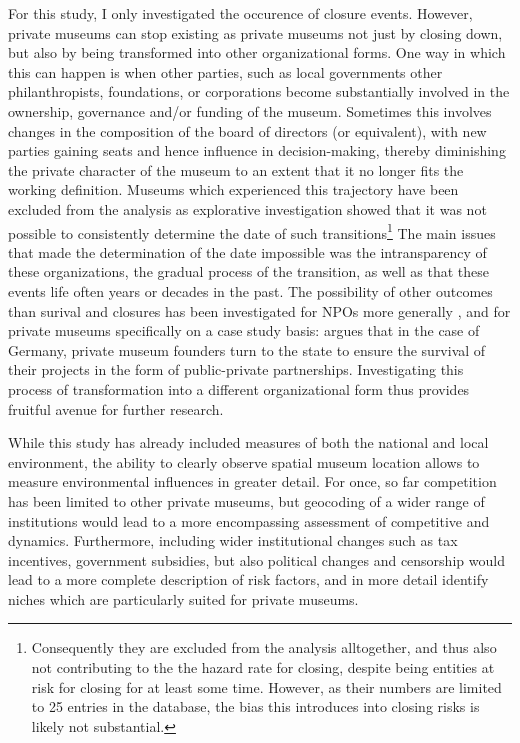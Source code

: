\documentclass[12pt]{article}
\begin{document}
For this study, I only investigated the occurence of closure events.
However, private museums can stop existing as private museums not just by closing down, but also by being transformed into other organizational forms.
One way in which this can happen is when other parties, such as local governments other philanthropists, foundations, or corporations become substantially involved in the ownership, governance and/or funding of the museum.
Sometimes this involves changes in the composition of the board of directors (or equivalent), with new parties gaining seats and hence influence in decision-making, thereby diminishing the private character of the museum to an extent that it no longer fits the working definition.
Museums which experienced this trajectory have been excluded from the analysis as explorative investigation showed that it was not possible to consistently determine the date of such transitions\footnote{Consequently they are excluded from the analysis alltogether, and thus also not contributing to the the hazard rate for closing, despite being entities at risk for closing for at least some time. However, as their numbers are limited to 25 entries in the database, the bias this introduces into closing risks is likely not substantial.}
The main issues that made the determination of the date impossible was the intransparency of these organizations, the gradual process of the transition, as well as that these events life often years or decades in the past.
The possibility of other outcomes than surival and closures has been investigated for NPOs more generally
\parencite{Searing_2020_zombies,HernandezOrtiz_2022_discontinuity,Helmig_Ingerfurth_Pinz_2013_nonprofit}, and for private museums specifically on a case study basis: 
\textcite{Walker_2019_collector} argues that in the case of Germany, private museum founders turn to the state to ensure the survival of their projects in the form of public-private partnerships.
Investigating this process of transformation into a different organizational form thus provides fruitful avenue for further research. 


While this study has already included measures of both the national and local environment, the ability to clearly observe spatial museum location allows to measure environmental influences in greater detail.
For once, so far competition has been limited to other private museums, but geocoding of a wider range of institutions would lead to a more encompassing assessment of competitive and dynamics.
Furthermore, including wider institutional changes such as tax incentives, government subsidies, but also political changes and censorship would lead to a more complete description of risk factors, and in more detail identify niches which are particularly suited for private museums.
\end{document}
